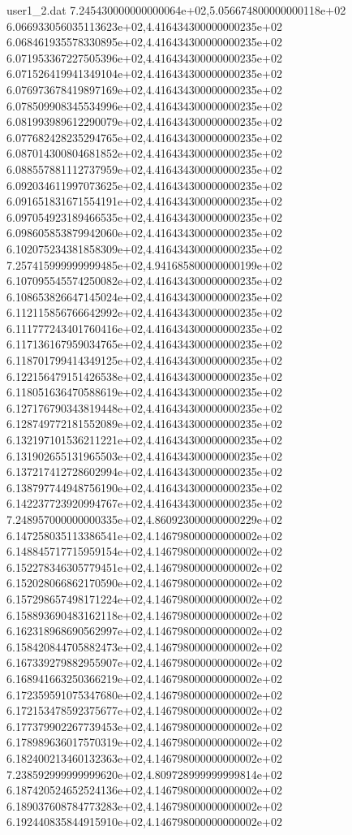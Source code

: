 \begin{filecontents}{user1_2.dat}
7.245430000000000064e+02,5.056674800000000118e+02
6.066933056035113623e+02,4.416434300000000235e+02
6.068461935578330895e+02,4.416434300000000235e+02
6.071953367227505396e+02,4.416434300000000235e+02
6.071526419941349104e+02,4.416434300000000235e+02
6.076973678419897169e+02,4.416434300000000235e+02
6.078509908345534996e+02,4.416434300000000235e+02
6.081993989612290079e+02,4.416434300000000235e+02
6.077682428235294765e+02,4.416434300000000235e+02
6.087014300804681852e+02,4.416434300000000235e+02
6.088557881112737959e+02,4.416434300000000235e+02
6.092034611997073625e+02,4.416434300000000235e+02
6.091651831671554191e+02,4.416434300000000235e+02
6.097054923189466535e+02,4.416434300000000235e+02
6.098605853879942060e+02,4.416434300000000235e+02
6.102075234381858309e+02,4.416434300000000235e+02
7.257415999999999485e+02,4.941685800000000199e+02
6.107095545574250082e+02,4.416434300000000235e+02
6.108653826647145024e+02,4.416434300000000235e+02
6.112115856766642992e+02,4.416434300000000235e+02
6.111777243401760416e+02,4.416434300000000235e+02
6.117136167959034765e+02,4.416434300000000235e+02
6.118701799414349125e+02,4.416434300000000235e+02
6.122156479151426538e+02,4.416434300000000235e+02
6.118051636470588619e+02,4.416434300000000235e+02
6.127176790343819448e+02,4.416434300000000235e+02
6.128749772181552089e+02,4.416434300000000235e+02
6.132197101536211221e+02,4.416434300000000235e+02
6.131902655131965503e+02,4.416434300000000235e+02
6.137217412728602994e+02,4.416434300000000235e+02
6.138797744948756190e+02,4.416434300000000235e+02
6.142237723920994767e+02,4.416434300000000235e+02
7.248957000000000335e+02,4.860923000000000229e+02
6.147258035113386541e+02,4.146798000000000002e+02
6.148845717715959154e+02,4.146798000000000002e+02
6.152278346305779451e+02,4.146798000000000002e+02
6.152028066862170590e+02,4.146798000000000002e+02
6.157298657498171224e+02,4.146798000000000002e+02
6.158893690483162118e+02,4.146798000000000002e+02
6.162318968690562997e+02,4.146798000000000002e+02
6.158420844705882473e+02,4.146798000000000002e+02
6.167339279882955907e+02,4.146798000000000002e+02
6.168941663250366219e+02,4.146798000000000002e+02
6.172359591075347680e+02,4.146798000000000002e+02
6.172153478592375677e+02,4.146798000000000002e+02
6.177379902267739453e+02,4.146798000000000002e+02
6.178989636017570319e+02,4.146798000000000002e+02
6.182400213460132363e+02,4.146798000000000002e+02
7.238592999999999620e+02,4.809728999999999814e+02
6.187420524652524136e+02,4.146798000000000002e+02
6.189037608784773283e+02,4.146798000000000002e+02
6.192440835844915910e+02,4.146798000000000002e+02

\end{filecontents}
